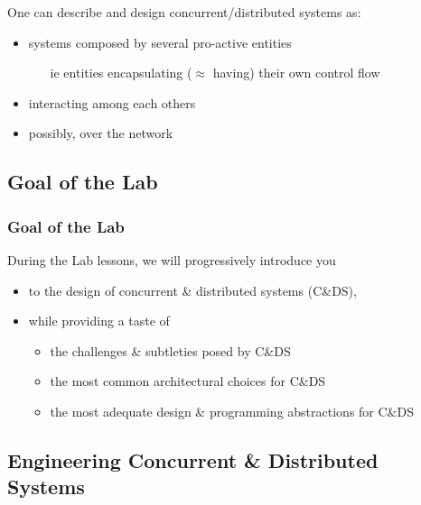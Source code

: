 \documentclass[presentation]{beamer}\mode<presentation>{\usetheme{AMSCesenaPurpleAndGold}}
\begin{document}
\begin{frame}[allowframebreaks]
	One can describe and design concurrent/distributed systems as:
	\begin{itemize}
		\item systems composed by several \alert{pro-active} entities
		\begin{itemize}
			\item[ie] entities \alert{encapsulating} ($\approx$ having) their own \alert{control flow}
		\end{itemize}
		\item \alert{interacting} among each others
		\item possibly, over the \alert{network}
	\end{itemize}

\end{frame}

\subsection{Goal of the Lab}

\begin{frame}
	\frametitle{Goal of the Lab}

	During the Lab lessons, we will progressively introduce you
	\vfill
	\begin{itemize}
		\item to the \alert{design} of concurrent \& distributed systems (C\&DS),

		\vfill

		\item while providing a taste of
		\begin{itemize}
			\item the challenges \& subtleties posed by C\&DS
			\item the most common architectural choices for C\&DS
			\item the most adequate design \& programming abstractions for C\&DS
		\end{itemize}

	\end{itemize}

\end{frame}

\subsection{Engineering Concurrent \& Distributed Systems}
\end{document}
